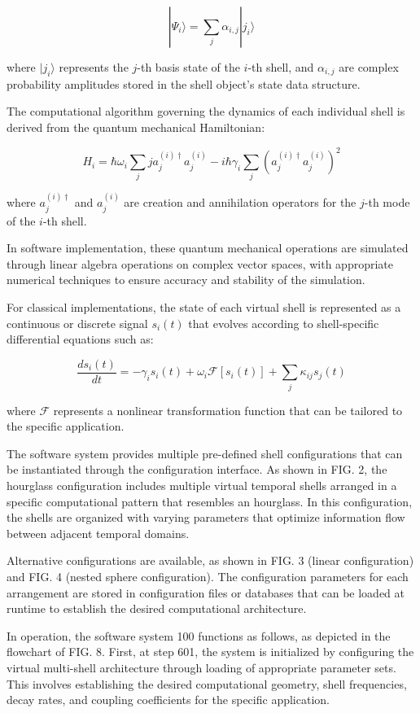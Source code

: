 \documentclass[12pt,letterpaper]{article}
\begin{document}
$$|\Psi_i\rangle = \sum_j \alpha_{i,j} |j_i\rangle$$

where $|j_i\rangle$ represents the $j$-th basis state of the $i$-th shell, and $\alpha_{i,j}$ are complex probability amplitudes stored in the shell object's state data structure.

The computational algorithm governing the dynamics of each individual shell is derived from the quantum mechanical Hamiltonian:

$$H_i = \hbar\omega_i \sum_j j a_j^{(i)\dagger} a_j^{(i)} - i\hbar\gamma_i \sum_j (a_j^{(i)\dagger} a_j^{(i)})^2$$

where $a_j^{(i)\dagger}$ and $a_j^{(i)}$ are creation and annihilation operators for the $j$-th mode of the $i$-th shell.

In software implementation, these quantum mechanical operations are simulated through linear algebra operations on complex vector spaces, with appropriate numerical techniques to ensure accuracy and stability of the simulation.

For classical implementations, the state of each virtual shell is represented as a continuous or discrete signal $s_i(t)$ that evolves according to shell-specific differential equations such as:

$$\frac{d s_i(t)}{dt} = -\gamma_i s_i(t) + \omega_i \mathcal{F}[s_i(t)] + \sum_j \kappa_{ij} s_j(t)$$

where $\mathcal{F}$ represents a nonlinear transformation function that can be tailored to the specific application.

The software system provides multiple pre-defined shell configurations that can be instantiated through the configuration interface. As shown in FIG. 2, the hourglass configuration includes multiple virtual temporal shells arranged in a specific computational pattern that resembles an hourglass. In this configuration, the shells are organized with varying parameters that optimize information flow between adjacent temporal domains.

Alternative configurations are available, as shown in FIG. 3 (linear configuration) and FIG. 4 (nested sphere configuration). The configuration parameters for each arrangement are stored in configuration files or databases that can be loaded at runtime to establish the desired computational architecture.

In operation, the software system 100 functions as follows, as depicted in the flowchart of FIG. 8. First, at step 601, the system is initialized by configuring the virtual multi-shell architecture through loading of appropriate parameter sets. This involves establishing the desired computational geometry, shell frequencies, decay rates, and coupling coefficients for the specific application.
\end{document}
